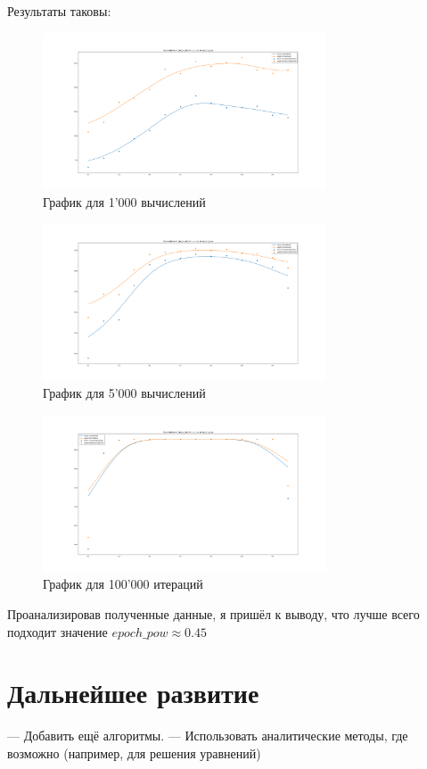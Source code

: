 \documentclass[11pt]{article}
\begin{document}
    Результаты таковы:
    \begin{figure}[h]
        \centering
        \includegraphics[width=0.75\textwidth]{exploring_optimal_epoch_pow_1000_iterations.png}
        \caption{График для 1'000 вычислений}
        \label{fig:epoch-pow-1000}
    \end{figure}
    \FloatBarrier

    \begin{figure}[h]
        \centering
        \includegraphics[width=0.75\textwidth]{exploring_optimal_epoch_pow_5000_iterations.png}
        \caption{График для 5'000 вычислений}
        \label{fig:epoch-pow-5000}
    \end{figure}
    \FloatBarrier

    \begin{figure}[h]
        \centering
        \includegraphics[width=0.75\textwidth]{exploring_optimal_epoch_pow_100000_iterations.png}
        \caption{График для 100'000 итераций}
        \label{fig:epoch-pow-100000}
    \end{figure}
    \FloatBarrier

    Проанализировав полученные данные, я пришёл к выводу, что лучше всего подходит значение $epoch\_pow \approx 0.45$

    \section{Дальнейшее развитие}\label{sec:subsequent-development}
    — Добавить ещё алгоритмы.
    — Использовать аналитические методы, где возможно (например, для решения уравнений)
\end{document}
